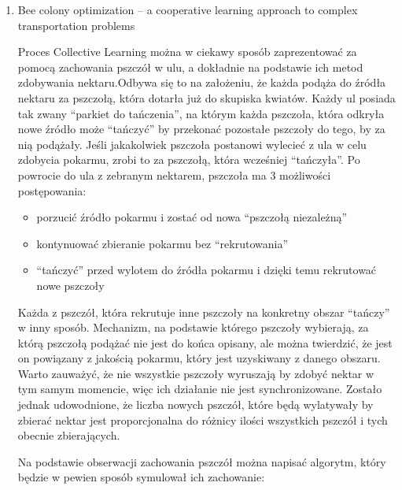 \documentclass[11pt]{aghdpl}
\begin{document}
\begin{enumerate}
\item Bee colony optimization – a cooperative learning approach to complex transportation problems \cite{BeeColonyOptimization}

Proces Collective Learning można w ciekawy sposób zaprezentować za pomocą zachowania pszczół w ulu, a dokładnie na podstawie ich metod zdobywania nektaru.Odbywa się to na założeniu, że każda podąża do źródła nektaru  za pszczołą, która dotarła już do skupiska kwiatów.  Każdy ul posiada tak zwany “parkiet do tańczenia”, na którym każda pszczoła, która odkryła nowe źródło może “tańczyć” by przekonać pozostałe pszczoły do tego, by za nią podążały. Jeśli jakakolwiek pszczoła postanowi wylecieć z ula w celu zdobycia pokarmu, zrobi to za pszczołą, która wcześniej “tańczyła”. Po powrocie do ula z zebranym nektarem, pszczoła ma 3 możliwości postępowania:
\begin{itemize}
        \item porzucić źródło pokarmu i zostać od nowa “pszczołą niezależną”
        \item kontynuować zbieranie pokarmu bez “rekrutowania”
        \item “tańczyć” przed wylotem do źródła pokarmu i dzięki temu rekrutować nowe pszczoły
\end{itemize}

Każda z pszczół, która rekrutuje inne pszczoły na konkretny obszar “tańczy” w inny sposób.
Mechanizm, na podstawie którego pszczoły wybierają, za którą pszczołą podążać nie jest do końca opisany, ale można twierdzić, że jest on powiązany z jakością pokarmu, który jest uzyskiwany z danego obszaru. Warto zauważyć, że nie wszystkie pszczoły wyruszają by zdobyć nektar w tym samym momencie, więc ich działanie nie jest synchronizowane. Zostało jednak udowodnione, że liczba nowych pszczół, które będą wylatywały by zbierać nektar jest proporcjonalna do różnicy ilości wszystkich pszczół i tych obecnie zbierających.

Na podstawie obserwacji zachowania pszczół można napisać algorytm, który będzie w pewien sposób symulował ich zachowanie:


\end{enumerate}
\end{document}

